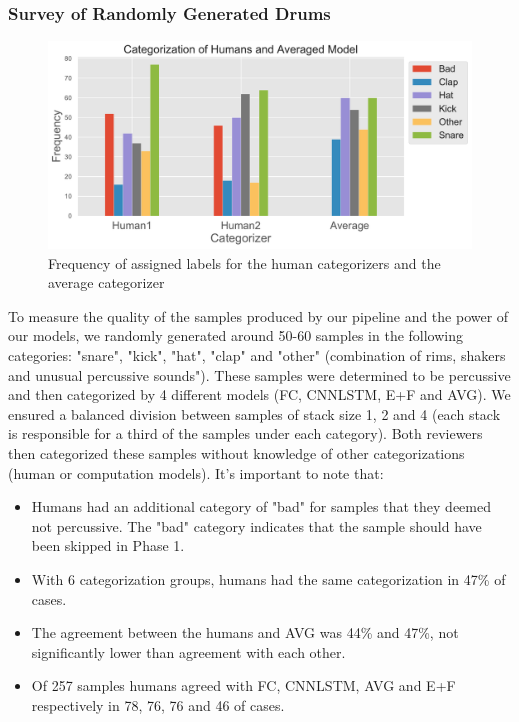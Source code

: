 \documentclass{nime-alternate} %
\begin{document}
 \subsubsection{Survey of Randomly Generated Drums}
\label{survey}
\begin{figure}[H]
\centering
\includegraphics[width=1.1\linewidth]{images/cat.pdf}
\caption{Frequency of assigned labels for the human categorizers and the average categorizer}
\label{fig:freq-survey}
\end{figure}
To measure the quality of the samples produced by our pipeline and the power of our models, we randomly generated around 50-60 samples in the following categories: "snare", "kick", "hat", "clap" and "other" (combination of rims, 
shakers and unusual percussive sounds"). These samples were determined to be percussive and then categorized by 4 different models (FC, CNNLSTM, E+F and AVG). We ensured a balanced division between samples of stack size 1, 2 and 4 (each stack is responsible for a third of the samples under each category). Both reviewers then categorized these samples without knowledge of other categorizations (human or computation models). It's important to note that:
\begin{itemize}
    \item Humans had an additional category of "bad" for samples that they deemed not percussive. The "bad" category indicates that the sample should have been skipped in Phase 1. 
    \item With 6 categorization groups, humans had the same categorization in 47\% of cases.
    \item The agreement between the humans and AVG was 44\% and 47\%, not significantly lower than agreement with each other. 
    \item Of 257 samples humans agreed with FC, CNNLSTM, AVG and E+F respectively in 78, 76, 76 and 46 of cases.
\end{itemize}
\end{document}
